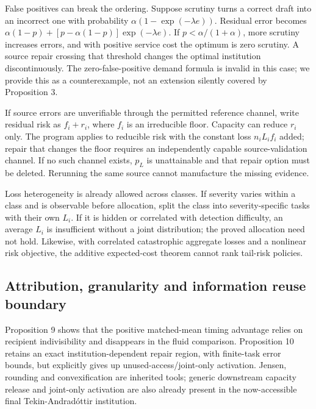 \documentclass[
  11pt,
  a4paper,
]{article}
\begin{document}
False positives can break the ordering. Suppose scrutiny turns a correct
draft into an incorrect one with probability
\(\alpha(1-\exp(-\lambda e))\). Residual error becomes
\(\alpha(1-p)+[p-\alpha(1-p)]\exp(-\lambda e)\). If
\(p<\alpha/(1+\alpha)\), more scrutiny increases errors, and with
positive service cost the optimum is zero scrutiny. A source repair
crossing that threshold changes the optimal institution discontinuously.
The zero-false-positive demand formula is invalid in this case; we
provide this as a counterexample, not an extension silently covered by
Proposition 3.

If source errors are unverifiable through the permitted reference
channel, write residual risk as \(f_i+r_i\), where \(f_i\) is an
irreducible floor. Capacity can reduce \(r_i\) only. The program applies
to reducible risk with the constant loss \(n_iL_i f_i\) added; repair
that changes the floor requires an independently capable
source-validation channel. If no such channel exists, \(p_L\) is
unattainable and that repair option must be deleted. Rerunning the same
source cannot manufacture the missing evidence.

Loss heterogeneity is already allowed across classes. If severity varies
within a class and is observable before allocation, split the class into
severity-specific tasks with their own \(L_i\). If it is hidden or
correlated with detection difficulty, an average \(L_i\) is insufficient
without a joint distribution; the proved allocation need not hold.
Likewise, with correlated catastrophic aggregate losses and a nonlinear
risk objective, the additive expected-cost theorem cannot rank tail-risk
policies.

\hypertarget{attribution-granularity-and-information-reuse-boundary}{%
\subsection{Attribution, granularity and information reuse
boundary}\label{attribution-granularity-and-information-reuse-boundary}}

Proposition 9 shows that the positive matched-mean timing advantage
relies on recipient indivisibility and disappears in the fluid
comparison. Proposition 10 retains an exact institution-dependent repair
region, with finite-task error bounds, but explicitly gives up
unused-access/joint-only activation. Jensen, rounding and
convexification are inherited tools; generic downstream capacity release
and joint-only activation are also already present in the now-accessible
final Tekin-Andradóttir institution.
\end{document}

